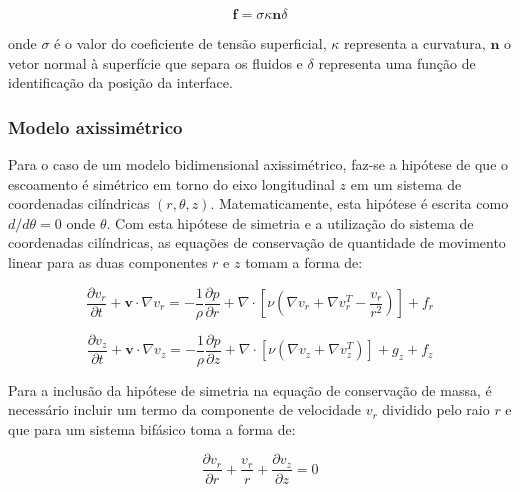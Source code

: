 \documentclass[a4paper,portuges,12pt]{article}
\newcommand{\vvet}{\mathbf{v}}
\newcommand{\nvet}{\mathbf{n}}
\begin{document}
\begin{equation}
	\mathbf{f} = \sigma \kappa \nvet \delta 
\label{eq:brackbill}
\end{equation}\vspace{0.5cm}

\noindent onde $\sigma$ é o valor do coeficiente de tensão superficial,
$\kappa$ representa a curvatura, $\nvet$ o vetor normal à superfície que
separa os fluidos e $\delta$ representa uma função de identificação da
posição da interface.

\subsubsection{Modelo axissimétrico}
\label{sec:axi}

Para o caso de um modelo bidimensional axissimétrico, faz-se a hipótese
de que o escoamento é simétrico em torno do eixo longitudinal $z$ em um
sistema de coordenadas cilíndricas $(r,\theta,z)$. Matematicamente, esta
hipótese é escrita como $d/d\theta=0$ onde $\theta$. Com esta hipótese
de simetria e a utilização do sistema de coordenadas cilíndricas, as
equações de conservação de quantidade de movimento linear para as duas
componentes $r$ e $z$ tomam a forma de:

\begin{equation}
	\frac{\partial v_r}{\partial t} + \vvet \cdot \nabla v_r
	= 
	- \frac{1}{\rho} \frac{\partial p}{\partial r} +
	\nabla \cdot [\nu(\nabla v_r + \nabla v_r^T - \frac{v_r}{r^2})] 
	+ 
	f_r
\label{eq:NSAxi1}
\end{equation}

\begin{equation}
	\frac{\partial v_z}{\partial t} + \vvet \cdot \nabla v_z
	= 
	- \frac{1}{\rho} \frac{\partial p}{\partial z} +
	\nabla \cdot [\nu(\nabla v_z + \nabla v_z^T)] + 
	g_z 
	+ 
	f_z
\label{eq:NSAxi}
\end{equation}\vspace{0.5cm}

Para a inclusão da hipótese de simetria na equação de conservação de
massa, é necessário incluir um termo da componente de velocidade $v_r$
dividido pelo raio $r$ e que para um sistema bifásico toma a forma de:

\begin{equation}
	\frac{\partial v_r}{\partial r}
	+
	\frac{v_r}{r}
	+
	\frac{\partial v_z}{\partial z}  
	= 
	0
	\label{eq:cm9-axi}
\end{equation}\vspace{0.5cm}
\end{document}

